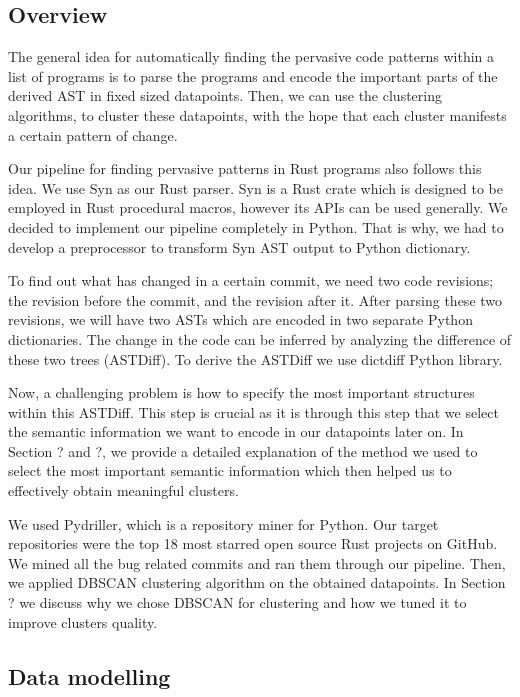 \subsection{Overview}

The general idea for automatically finding the pervasive code patterns within a list of programs is to parse the programs and encode the important parts of the derived AST in fixed sized datapoints. Then, we can use the clustering algorithms, to cluster these datapoints, with the hope that each cluster manifests a certain pattern of change.

Our pipeline for finding pervasive patterns in Rust programs also follows this idea. We use Syn as our Rust parser. Syn is a Rust crate which is designed to be employed in Rust procedural macros, however its APIs can be used generally. We decided to implement our pipeline completely in Python. That is why, we had to develop a preprocessor to transform Syn AST output to Python dictionary.

To find out what has changed in a certain commit, we need two code revisions; the revision before the commit, and the revision after it. After parsing these two revisions, we will have two ASTs which are encoded in two separate Python dictionaries. The change in the code can be inferred by analyzing the difference of these two trees (ASTDiff). To derive the ASTDiff we use dictdiff Python library. 

Now, a challenging problem is how to specify the most important structures within this ASTDiff. This step is crucial as it is through this step that we select the semantic information we want to encode in our datapoints later on. In Section ? and ?, we provide a detailed explanation of the method we used to select the most important semantic information which then helped us to effectively obtain meaningful clusters.

We used Pydriller, which is a repository miner for Python. Our target repositories were the top 18 most starred open source Rust projects on GitHub. We mined all the bug related commits and ran them through our pipeline. Then, we applied DBSCAN clustering algorithm on the obtained datapoints. In Section ? we discuss why we chose DBSCAN for clustering and how we tuned it to improve clusters quality. 

\subsection{Data modelling}

